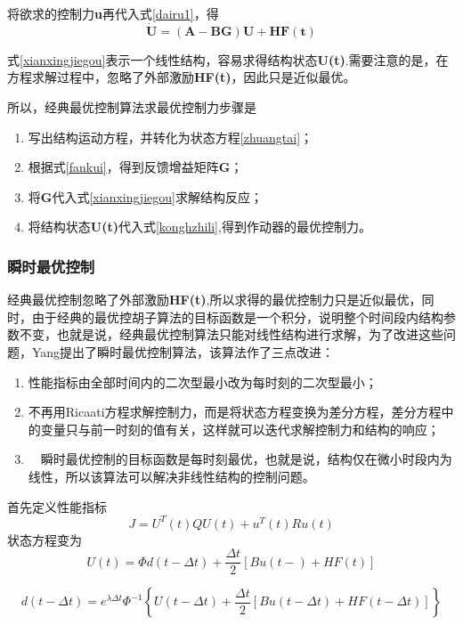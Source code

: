 将欲求的控制力\textbf{u}再代入式\eqref{dairu1}，得
\begin{equation}
\dot{\mathbf{U}}=\mathbf{(A-BG)U+HF(t)}  \label{xianxingjiegou}
\end{equation}

式\eqref{xianxingjiegou}表示一个线性结构，容易求得结构状态\textbf{U(t)}.需要注意的是，在方程求解过程中，忽略了外部激励\textbf{HF(t)}，因此只是近似最优。

所以，经典最优控制算法求最优控制力步骤是
\begin{enumerate}
\item 写出结构运动方程，并转化为状态方程\eqref{zhuangtai}；
\item 根据式\eqref{fankui}，得到反馈增益矩阵\textbf{G}；
\item 将\textbf{G}代入式\eqref{xianxingjiegou}求解结构反应；
\item 将结构状态\textbf{U(t)}代入式\eqref{konghzhili},得到作动器的最优控制力。
\end{enumerate}
\subsubsection{瞬时最优控制}
经典最优控制忽略了外部激励\textbf{HF(t)},所以求得的最优控制力只是近似最优，同时，由于经典的最优控胡子算法的目标函数是一个积分，说明整个时间段内结构参数不变，也就是说，经典最优控制算法只能对线性结构进行求解，为了改进这些问题，Yang提出了瞬时最优控制算法，该算法作了三点改进：
\begin{enumerate}
\item 性能指标由全部时间内的二次型最小改为每时刻的二次型最小；
\item 不再用Ricaati方程求解控制力，而是将状态方程变换为差分方程，差分方程中的变量只与前一时刻的值有关，这样就可以迭代求解控制力和结构的响应；
\item　瞬时最优控制的目标函数是每时刻最优，也就是说，结构仅在微小时段内为线性，所以该算法可以解决非线性结构的控制问题。
\end{enumerate}

首先定义性能指标
\begin{equation}
J=U^T(t)QU(t)+u^T(t)Ru(t)
\end{equation}
状态方程变为
\begin{equation}
U(t)=\Phi d(t-\Delta t)+\frac{\Delta t}{2}\left[Bu(t-)+HF(t)\right]\label{dairu2}
\end{equation}


\begin{equation}
d(t-\Delta t)=e^{\lambda \Delta t}\Phi^{-1}\left\lbrace U(t-\Delta t)+ \frac{\Delta t}{2}\left[Bu(t-\Delta t)+HF(t-\Delta t)\right]\right\rbrace\label{dairu3}
\end{equation}

